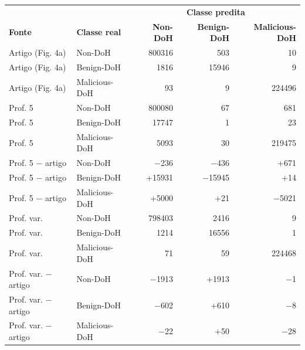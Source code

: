 \begin{tabular}{llrrr}
\hline
\multicolumn{2}{c}{\textbf{}} & \multicolumn{3}{c}{\textbf{Classe predita}} \\
\textbf{Fonte} & \textbf{Classe real} & \textbf{Non-DoH} & \textbf{Benign-DoH} & \textbf{Malicious-DoH} \\ \hline
Artigo (Fig. 4a) & Non-DoH & 800316 & 503 & 10 \\
Artigo (Fig. 4a) & Benign-DoH & 1816 & 15946 & 9 \\
Artigo (Fig. 4a) & Malicious-DoH & 93 & 9 & 224496 \\
\hline
Prof. 5 & Non-DoH & 800080 & 67 & 681 \\
Prof. 5 & Benign-DoH & 17747 & 1 & 23 \\
Prof. 5 & Malicious-DoH & 5093 & 30 & 219475 \\
Prof. 5 $-$ artigo & Non-DoH & $-$236 & $-$436 & +671 \\
Prof. 5 $-$ artigo & Benign-DoH & +15931 & $-$15945 & +14 \\
Prof. 5 $-$ artigo & Malicious-DoH & +5000 & +21 & $-$5021 \\
\hline
Prof. var. & Non-DoH & 798403 & 2416 & 9 \\
Prof. var. & Benign-DoH & 1214 & 16556 & 1 \\
Prof. var. & Malicious-DoH & 71 & 59 & 224468 \\
Prof. var. $-$ artigo & Non-DoH & $-$1913 & +1913 & $-$1 \\
Prof. var. $-$ artigo & Benign-DoH & $-$602 & +610 & $-$8 \\
Prof. var. $-$ artigo & Malicious-DoH & $-$22 & +50 & $-$28 \\
\hline
\end{tabular}
